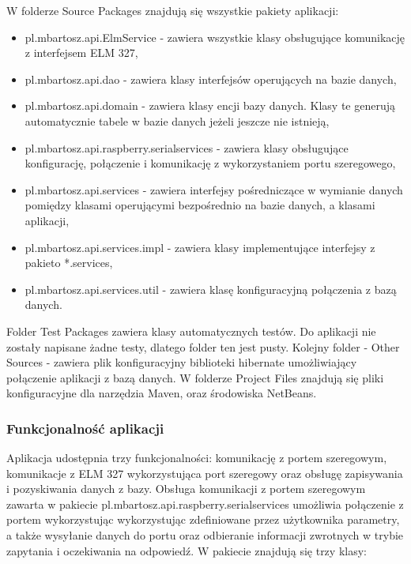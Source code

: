\documentclass[12pt]{article} %
\numberwithin{equation}{subsection}
\numberwithin{figure}{section}
\numberwithin{table}{section}
\begin{document}
	W folderze Source Packages znajdują się wszystkie pakiety aplikacji:
	
	\begin{itemize}
		\item{pl.mbartosz.api.ElmService - zawiera wszystkie klasy obsługujące komunikację z interfejsem ELM 327,}
		\item{pl.mbartosz.api.dao - zawiera klasy interfejsów operujących na bazie danych,}
		\item{pl.mbartosz.api.domain - zawiera klasy encji bazy danych. Klasy te generują automatycznie tabele w bazie danych jeżeli jeszcze nie istnieją,}
		\item{pl.mbartosz.api.raspberry.serialservices - zawiera klasy obsługujące konfigurację, połączenie i komunikację z wykorzystaniem portu szeregowego,}
		\item{pl.mbartosz.api.services - zawiera interfejsy pośredniczące w wymianie danych pomiędzy klasami operującymi bezpośrednio na bazie danych, a klasami aplikacji, }
		\item{pl.mbartosz.api.services.impl - zawiera klasy implementujące interfejsy z pakieto *.services,}
		\item{pl.mbartosz.api.services.util - zawiera klasę konfiguracyjną połączenia z bazą danych.}
	\end{itemize}
	
	Folder Test Packages zawiera klasy automatycznych testów. Do aplikacji nie zostały napisane żadne testy, dlatego folder ten jest pusty. Kolejny folder - Other Sources - zawiera plik konfiguracyjny biblioteki hibernate umożliwiający połączenie aplikacji z bazą danych. W folderze Project Files znajdują się pliki konfiguracyjne dla narzędzia Maven, oraz środowiska NetBeans.
	
	\subsubsection{Funkcjonalność aplikacji}	
	
	\hspace{0.5cm}Aplikacja udostępnia trzy funkcjonalności: komunikację z portem szeregowym, komunikacje z ELM 327 wykorzystująca port szeregowy oraz obsługę zapisywania i pozyskiwania danych z bazy. Obsługa komunikacji z portem szeregowym zawarta w pakiecie pl.mbartosz.api.raspberry.serialservices umożliwia połączenie z portem wykorzystując wykorzystując zdefiniowane przez użytkownika parametry, a także wysyłanie danych do portu oraz odbieranie informacji zwrotnych w trybie zapytania i oczekiwania na odpowiedź. W pakiecie znajdują się trzy klasy:
	
\end{document}
